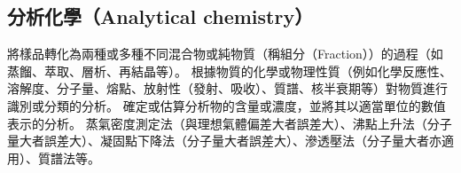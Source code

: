 \documentclass[a4paper,12pt]{article}
\begin{document}
\subsection{分析化學（Analytical chemistry）}
將樣品轉化為兩種或多種不同混合物或純物質（稱組分（Fraction））的過程（如蒸餾、萃取、層析、再結晶等）。
根據物質的化學或物理性質（例如化學反應性、溶解度、分子量、熔點、放射性（發射、吸收）、質譜、核半衰期等）對物質進行識別或分類的分析。
確定或估算分析物的含量或濃度，並將其以適當單位的數值表示的分析。
蒸氣密度測定法（與理想氣體偏差大者誤差大）、沸點上升法（分子量大者誤差大）、凝固點下降法（分子量大者誤差大）、滲透壓法（分子量大者亦適用）、質譜法等。
\end{document}
